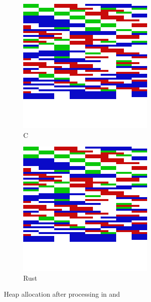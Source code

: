 \begin{figure}[H]

  \centering
  \begin{subfigure}{0.47\textwidth}
    \centering
    \includegraphics[scale=0.15]{results/plots/heap/cfrag}
    \caption{C}
    \label{fig:heap:frag:c}
  \end{subfigure}
  \hfill
  \begin{subfigure}{0.47\textwidth}
      \centering
    \includegraphics[scale=0.15]{results/plots/heap/rfrag}
    \caption{Rust}
    \label{fig:heap:frag:r}
  \end{subfigure}
  \caption{Heap allocation after processing in {\rust} and {\C}}
  \label{fig:heap:frag}

\end{figure}
